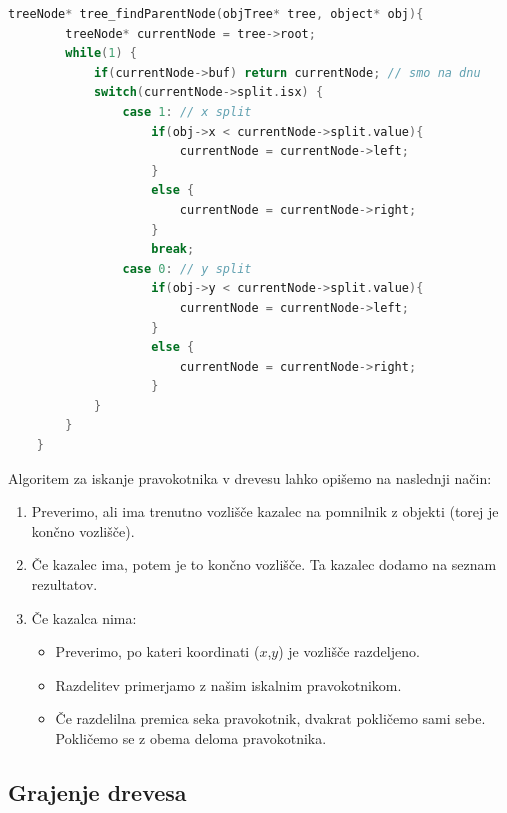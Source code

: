 \documentclass[a4paper,12pt]{article}
\begin{document}
\newpage

\begin{lstlisting}[float, caption={Iskanje vozlišča, ki vsebuje objekt}, label=find_parent_node, language=C]
    treeNode* tree_findParentNode(objTree* tree, object* obj){
        treeNode* currentNode = tree->root;
        while(1) {
            if(currentNode->buf) return currentNode; // smo na dnu
            switch(currentNode->split.isx) {
                case 1: // x split
                    if(obj->x < currentNode->split.value){
                        currentNode = currentNode->left;
                    }
                    else {
                        currentNode = currentNode->right;
                    }
                    break;
                case 0: // y split
                    if(obj->y < currentNode->split.value){
                        currentNode = currentNode->left;
                    }
                    else {
                        currentNode = currentNode->right;
                    }
            }
        }
    }
\end{lstlisting}


Algoritem za iskanje pravokotnika v drevesu lahko opišemo na naslednji način:
\begin{samepage}
    \begin{enumerate}
        \item Preverimo, ali ima trenutno vozlišče kazalec na pomnilnik z objekti (torej je končno vozlišče).
        \item Če kazalec ima, potem je to končno vozlišče. Ta kazalec dodamo na seznam rezultatov.
        \item Če kazalca nima:
        \begin{itemize}
            \item Preverimo, po kateri koordinati ($x$,$y$) je vozlišče razdeljeno.
            \item Razdelitev primerjamo z našim iskalnim pravokotnikom.
            \item Če razdelilna premica seka pravokotnik, dvakrat pokličemo sami sebe.
            Pokličemo se z obema deloma pravokotnika.
        \end{itemize}
    \end{enumerate}
\end{samepage}

\newpage
\subsection{Grajenje drevesa}
\end{document}
